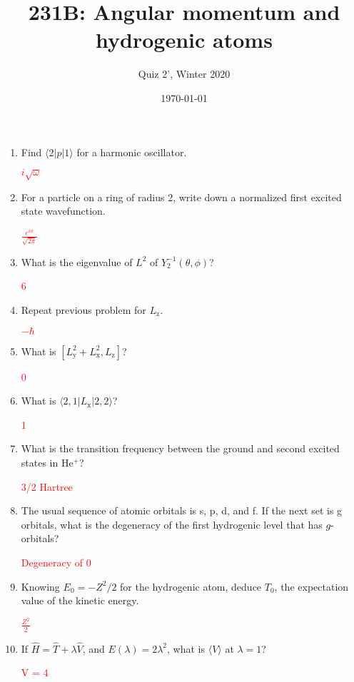 
\usepackage{xcolor}



\title{231B: Angular momentum and hydrogenic atoms}
\author{Quiz 2', Winter 2020}
\date{\today}
\maketitle

\begin{enumerate}

\item Find $\langle 2 | p | 1 \rangle$ for a harmonic oscillator.

\textcolor{red}{$i\sqrt{\omega}$}

\item For a particle on a ring of radius 2, write down a normalized
first excited state wavefunction.

\textcolor{red}{$\frac{e^{i\phi}}{\sqrt{2\pi}}$}

\item What is the eigenvalue of $L^2$ of $Y_2^{-1}(\theta,\phi)$?

\textcolor{red}{6}

\item Repeat previous problem for $L_{\text{z}}$.

\textcolor{red}{$-\hbar$}

\item What is $[L^2_{\text{y}}+L^2_{\text{x}},L_{\text{z}}]$?

\textcolor{red}{0}

\item What is $\langle 2,1| L_{\text{x}} | 2,2 \rangle$?

\textcolor{red}{1}

\item What is the transition frequency between the ground and second
excited states in He$^{+}$?

\textcolor{red}{3/2 Hartree}

\item The usual sequence of atomic orbitals is s, p, d, and f. If
the next set is g orbitals, what is the degeneracy of the first
hydrogenic level that has $g$-orbitals?

\textcolor{red}{Degeneracy of 0}

\item Knowing $E_0 = -Z^2/2$ for the hydrogenic atom,
deduce $T_0$, the expectation value of the kinetic energy.

\textcolor{red}{$\frac{Z^2}{2}$}

\item If $\hat{H} = \hat{T} + \lambda \hat{V}$, and
$E(\lambda) = 2\lambda^2$, what is $\langle V \rangle$ at $\lambda=1$?

\textcolor{red}{V = 4}

\end{enumerate}

